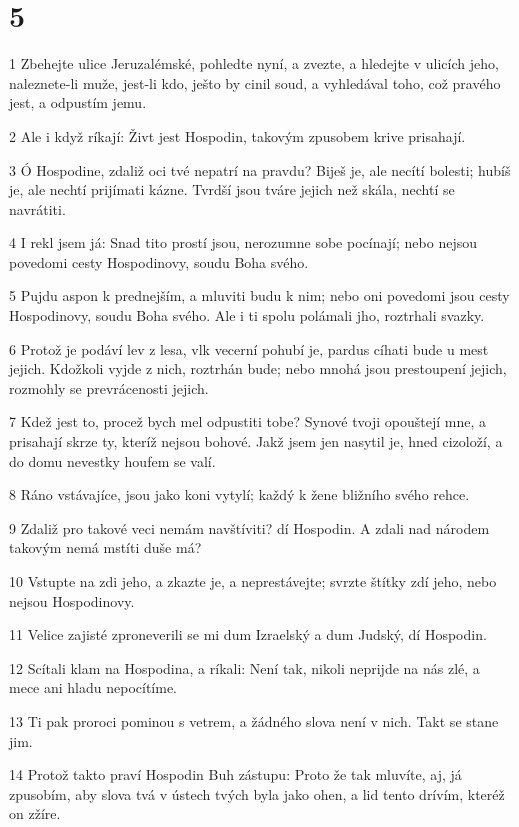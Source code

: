 \chapter{5}

\par 1 Zbehejte ulice Jeruzalémské, pohledte nyní, a zvezte, a hledejte v ulicích jeho, naleznete-li muže, jest-li kdo, ješto by cinil soud, a vyhledával toho, což pravého jest, a odpustím jemu.
\par 2 Ale i když ríkají: Živt jest Hospodin, takovým zpusobem krive prisahají.
\par 3 Ó Hospodine, zdaliž oci tvé nepatrí na pravdu? Biješ je, ale necítí bolesti; hubíš je, ale nechtí prijímati kázne. Tvrdší jsou tváre jejich než skála, nechtí se navrátiti.
\par 4 I rekl jsem já: Snad tito prostí jsou, nerozumne sobe pocínají; nebo nejsou povedomi cesty Hospodinovy, soudu Boha svého.
\par 5 Pujdu aspon k prednejším, a mluviti budu k nim; nebo oni povedomi jsou cesty Hospodinovy, soudu Boha svého. Ale i ti spolu polámali jho, roztrhali svazky.
\par 6 Protož je podáví lev z lesa, vlk vecerní pohubí je, pardus cíhati bude u mest jejich. Kdožkoli vyjde z nich, roztrhán bude; nebo mnohá jsou prestoupení jejich, rozmohly se prevrácenosti jejich.
\par 7 Kdež jest to, procež bych mel odpustiti tobe? Synové tvoji opouštejí mne, a prisahají skrze ty, kteríž nejsou bohové. Jakž jsem jen nasytil je, hned cizoloží, a do domu nevestky houfem se valí.
\par 8 Ráno vstávajíce, jsou jako koni vytylí; každý k žene bližního svého rehce.
\par 9 Zdaliž pro takové veci nemám navštíviti? dí Hospodin. A zdali nad národem takovým nemá mstíti duše má?
\par 10 Vstupte na zdi jeho, a zkazte je, a neprestávejte; svrzte štítky zdí jeho, nebo nejsou Hospodinovy.
\par 11 Velice zajisté zproneverili se mi dum Izraelský a dum Judský, dí Hospodin.
\par 12 Scítali klam na Hospodina, a ríkali: Není tak, nikoli neprijde na nás zlé, a mece ani hladu nepocítíme.
\par 13 Ti pak proroci pominou s vetrem, a žádného slova není v nich. Takt se stane jim.
\par 14 Protož takto praví Hospodin Buh zástupu: Proto že tak mluvíte, aj, já zpusobím, aby slova tvá v ústech tvých byla jako ohen, a lid tento drívím, kteréž on zžíre.
